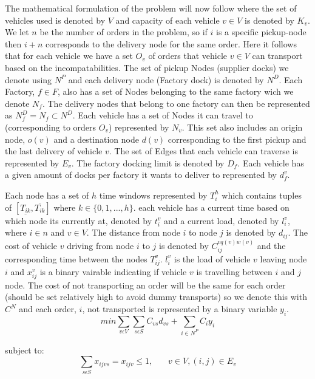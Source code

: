 \documentclass[a4paper,12pt]{article}
\begin{document}
The mathematical formulation of the problem will now follow where the set of vehicles used is denoted by $V$ and capacity of each vehicle $v \in V$ is denoted by $K_v$. We let $n$ be the number of orders in the problem, so if $i$ is a specific pickup-node then $i+n$ corresponds to the delivery node for the same order. Here it follows that for each vehicle we have a set $O_v$ of orders that vehicle $v \in V$ can transport based on the incompatabilities. The set of pickup Nodes (supplier docks) we denote using $N^P$ and each delivery node (Factory dock) is denoted by $N^D$. Each Factory, $f \in F$, also has a set of Nodes belonging to the same factory wich we denote $N_f$. The delivery nodes that belong to one factory can then be represented as $N_f^D = N_f \subset N^D$. Each vehicle has a set of Nodes it can travel to (corresponding to orders $O_v$) represented by $N_v$. This set also includes an origin node, $o(v)$ and a destination node $d(v)$ corresponding to the first pickup and the last delivery of vehicle $v$. The set of Edges that each vehicle can traverse is represented by $E_v$. The factory docking limit is denoted by $D_f$. Each vehicle has a given amount of docks per factory it wants to deliver to represented by $d_{f}^v$. \par 
Each node has a set of $h$ time windows represented by $T_i^h$ which contains tuples of $[ \underline{T_{ik}},  \overline{T_{ik}} ]$ where $k \in \{0,1,...,h\}$. each vehicle has a current time based on which node its currently at, denoted by $t_{i}^v$ and a current load, denoted by $l_{i}^v$, where $i \in n$ and $v \in V$. The distance from node $i$ to node $j$ is denoted by $d_{ij}$. The cost of vehicle $v$ driving from node $i$ to $j$ is denoted by $C_{ij}^{vq(v)w(v)}$ and the corresponding time between the nodes $T_{ij}^v$. $l_{i}^v$ is the load of vehicle $v$ leaving node $i$ and $x_{ij}^v$ is a binary vairable indicating if vehicle $v$ is travelling between $i$ and $j$ node. The cost of not transporting an order will be the same for each order (should be set relatively high to avoid dummy transports) so we denote this with $C^N$ and each order, $i$,  not transported is represented by a binary variable $y_i$. 
\begin{equation}
\label{eq:1}
min\sum_{v\epsilon V} \sum_{s \epsilon S} C_{vs}d_{vs} + \sum_{i\in N^P}C_iy_i
\end{equation}

subject to:
\begin{equation} \label{eq:2}
    \sum_{s\epsilon S} x_{ijvs} = x_{ijv} \leq 1, ~~~~~~~~ v \in V, (i, j)\in E_v
\end{equation}
\end{document}
